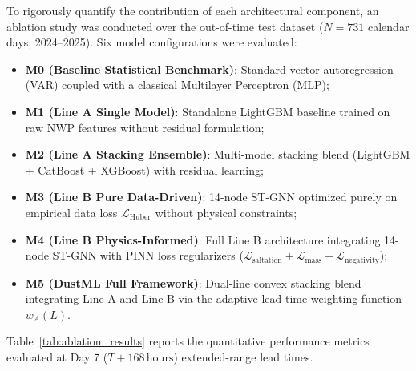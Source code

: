 To rigorously quantify the contribution of each architectural component, an ablation study was conducted over the out-of-time test dataset ($N=731$ calendar days, 2024--2025). Six model configurations were evaluated:
\begin{itemize}
    \item \textbf{M0 (Baseline Statistical Benchmark)}: Standard vector autoregression (VAR) coupled with a classical Multilayer Perceptron (MLP);
    \item \textbf{M1 (Line A Single Model)}: Standalone LightGBM baseline trained on raw NWP features without residual formulation;
    \item \textbf{M2 (Line A Stacking Ensemble)}: Multi-model stacking blend (LightGBM + CatBoost + XGBoost) with residual learning;
    \item \textbf{M3 (Line B Pure Data-Driven)}: 14-node ST-GNN optimized purely on empirical data loss $\mathcal{L}_{\text{Huber}}$ without physical constraints;
    \item \textbf{M4 (Line B Physics-Informed)}: Full Line B architecture integrating 14-node ST-GNN with PINN loss regularizers ($\mathcal{L}_{\text{saltation}} + \mathcal{L}_{\text{mass}} + \mathcal{L}_{\text{negativity}}$);
    \item \textbf{M5 (DustML Full Framework)}: Dual-line convex stacking blend integrating Line A and Line B via the adaptive lead-time weighting function $w_A(L)$.
\end{itemize}

Table~\ref{tab:ablation_results} reports the quantitative performance metrics evaluated at Day 7 ($T+168\,\text{hours}$) extended-range lead times.


